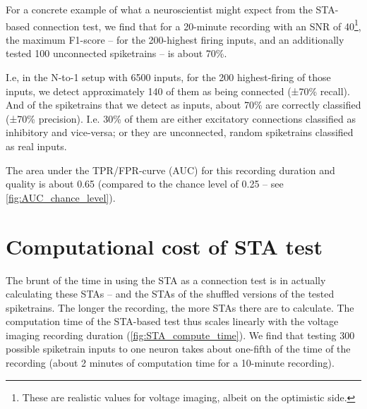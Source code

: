 For a concrete example of what a neuroscientist might expect from the STA-based connection test, we find that for a 20-minute recording with an SNR of 40\footnote{These are realistic values for voltage imaging, albeit on the optimistic side.},
the maximum F1-score -- for the 200-highest firing inputs, and an additionally tested 100 unconnected spiketrains -- is about 70\%.

I.e, in the N-to-1 setup with 6500 inputs, for the 200 highest-firing of those inputs, we detect approximately 140 of them as being connected (±70\% recall). And of the spiketrains that we detect as inputs, about 70\% are correctly classified  (±70\% precision). I.e. 30\% of them are either excitatory connections classified as inhibitory and vice-versa; or they are unconnected, random spiketrains classified as real inputs.

The area under the TPR/FPR-curve (AUC) for this recording duration and quality is about 0.65 (compared to the chance level of 0.25 -- see \cref{fig:AUC_chance_level}).



\FloatBarrier
\section{Computational cost of STA test}

The brunt of the time in using the STA as a connection test is in actually calculating these STAs -- and the STAs of the shuffled versions of the tested spiketrains. The longer the recording, the more STAs there are to calculate. The computation time of the STA-based test thus scales linearly with the voltage imaging recording duration (\cref{fig:STA_compute_time}). We find that testing 300 possible spiketrain inputs to one neuron takes about one-fifth of the time of the recording (about 2 minutes of computation time for a 10-minute recording).

